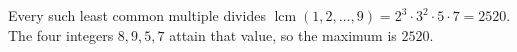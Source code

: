 Every such least common multiple divides $\operatorname{lcm}(1,2,\ldots,9)=2^3\cdot3^2\cdot5\cdot7=2520$. The four integers $8,9,5,7$ attain that value, so the maximum is $\boxed{2520}$.
